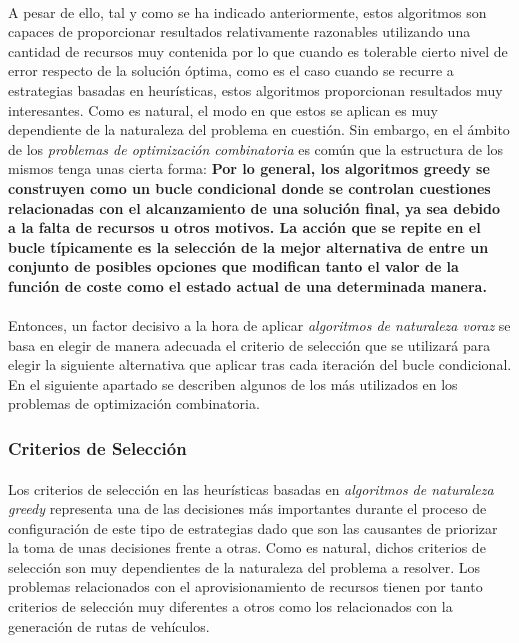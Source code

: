 \documentclass{subfiles}
\begin{document}
        \paragraph{}
        A pesar de ello, tal y como se ha indicado anteriormente, estos algoritmos son capaces de proporcionar resultados relativamente razonables utilizando una cantidad de recursos muy contenida por lo que cuando es tolerable cierto nivel de error respecto de la solución óptima, como es el caso cuando se recurre a estrategias basadas en heurísticas, estos algoritmos proporcionan resultados muy interesantes. Como es natural, el modo en que estos se aplican es muy dependiente de la naturaleza del problema en cuestión. Sin embargo, en el ámbito de los \emph{problemas de optimización combinatoria} es común que la estructura de los mismos tenga unas cierta forma: \textbf{Por lo general, los algoritmos greedy se construyen como un bucle condicional donde se controlan cuestiones relacionadas con el alcanzamiento de una solución final, ya sea debido a la falta de recursos u otros motivos. La acción que se repite en el bucle típicamente es la selección de la mejor alternativa de entre un conjunto de posibles opciones que modifican tanto el valor de la función de coste como el estado actual de una determinada manera.}

        \paragraph{}
        Entonces, un factor decisivo a la hora de aplicar \emph{algoritmos de naturaleza voraz} se basa en elegir de manera adecuada el criterio de selección que se utilizará para elegir la siguiente alternativa que aplicar tras cada iteración del bucle condicional. En el siguiente apartado se describen algunos de los más utilizados en los problemas de optimización combinatoria.

        \subsubsection{Criterios de Selección}
        \label{sec:solving_greedy_criterions}

          \paragraph{}
          Los criterios de selección en las heurísticas basadas en \emph{algoritmos de naturaleza greedy} representa una de las decisiones más importantes durante el proceso de configuración de este tipo de estrategias dado que son las causantes de priorizar la toma de unas decisiones frente a otras. Como es natural, dichos criterios de selección son muy dependientes de la naturaleza del problema a resolver. Los problemas relacionados con el aprovisionamiento de recursos tienen por tanto criterios de selección muy diferentes a otros como los relacionados con la generación de rutas de vehículos.
\end{document}
